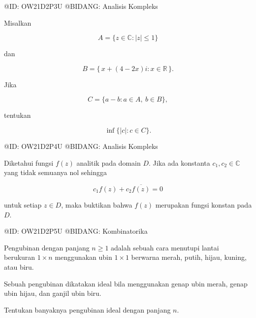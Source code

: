 @ID: OW21D2P3U
@BIDANG: Analisis Kompleks

Misalkan

$$
A=\{z\in\mathbb C:|z|\le1\}
$$

dan

$$
B=\{\,x+(4-2x)i:x\in\mathbb R\,\}.
$$

Jika

$$
C=\{a-b:a\in A,\ b\in B\},
$$

tentukan

$$
\inf\{|c|:c\in C\}.
$$

@ID: OW21D2P4U
@BIDANG: Analisis Kompleks

Diketahui fungsi $f(z)$ analitik pada domain $D$. Jika ada konstanta $c_1,c_2\in\mathbb C$ yang tidak semuanya nol sehingga

$$
c_1f(z)+c_2\overline{f(z)}=0
$$

untuk setiap $z\in D$, maka buktikan bahwa $f(z)$ merupakan fungsi konstan pada $D$.

@ID: OW21D2P5U
@BIDANG: Kombinatorika

Pengubinan dengan panjang $n\ge1$ adalah sebuah cara menutupi lantai berukuran $1\times n$ menggunakan ubin $1\times1$ berwarna merah, putih, hijau, kuning, atau biru.

Sebuah pengubinan dikatakan ideal bila menggunakan genap ubin merah, genap ubin hijau, dan ganjil ubin biru.

Tentukan banyaknya pengubinan ideal dengan panjang $n$.
